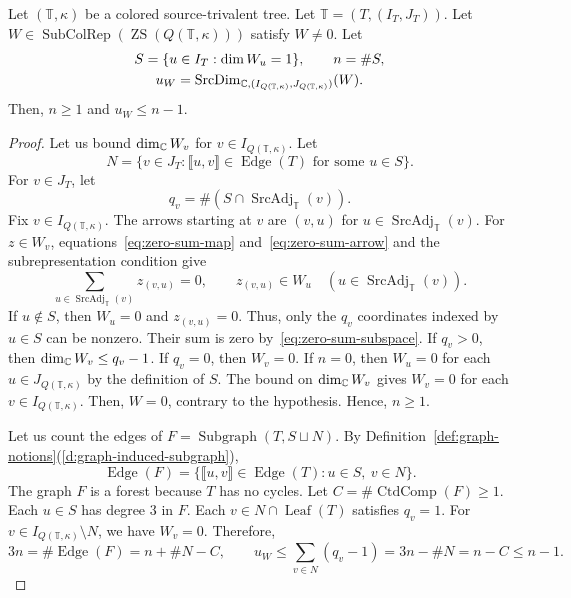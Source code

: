 \begin{lemma}\label{lem:zero-sum-source-bound}
Let $(\mathbb T,\kappa)$ be a colored source-trivalent tree.
Let $\mathbb T=(T,(I_T,J_T))$.
Let $W\in\operatorname{SubColRep}(\operatorname{ZS}(Q(\mathbb T,\kappa)))$ satisfy $W\ne0$.
Let
\[
\begin{gathered}
 S=\{u\in I_{T}:\dim W_u=1\},\qquad n=\#S,\\
 u_W=\operatorname{SrcDim}_{\mathbb C,(I_{Q(\mathbb T,\kappa)},J_{Q(\mathbb T,\kappa)})}(W).
\end{gathered}
\]
Then, $n\ge1$ and $u_W\le n-1$.
\end{lemma}
\begin{proof}
Let us bound $\dim_{\mathbb C}W_v$ for $v\in I_{Q(\mathbb T,\kappa)}$.
Let
\[
 N=\{v\in J_{T}:\llbracket u,v\rrbracket\in\operatorname{Edge}(T)
       \text{ for some }u\in S\}.
\]
For $v\in J_{T}$, let
\[
 q_v=\#(S\cap\operatorname{SrcAdj}_{\mathbb T}(v)).
\]
Fix $v\in I_{Q(\mathbb T,\kappa)}$.
The arrows starting at $v$ are $(v,u)$ for $u\in\operatorname{SrcAdj}_{\mathbb T}(v)$.
For $z\in W_v$, equations~\eqref{eq:zero-sum-map} and~\eqref{eq:zero-sum-arrow} and the subrepresentation condition give
\begin{equation}\label{eq:zero-sum-subspace}
 \sum_{u\in\operatorname{SrcAdj}_{\mathbb T}(v)}z_{(v,u)}=0,
 \qquad z_{(v,u)}\in W_u
 \quad(u\in\operatorname{SrcAdj}_{\mathbb T}(v)).
\end{equation}
If $u\notin S$, then $W_u=0$ and $z_{(v,u)}=0$.
Thus, only the $q_v$ coordinates indexed by $u\in S$ can be nonzero. Their sum is zero by~\eqref{eq:zero-sum-subspace}.
If $q_v>0$, then $\dim_{\mathbb C}W_v\le q_v-1$. If $q_v=0$, then $W_v=0$.
If $n=0$, then $W_u=0$ for each $u\in J_{Q(\mathbb T,\kappa)}$ by the definition of $S$.
The bound on $\dim_{\mathbb C}W_v$ gives $W_v=0$ for each $v\in I_{Q(\mathbb T,\kappa)}$.
Then, $W=0$, contrary to the hypothesis. Hence, $n\ge1$.

Let us count the edges of $F=\operatorname{Subgraph}(T,S\sqcup N)$.
By Definition~\ref{def:graph-notions}(\ref{d:graph-induced-subgraph}),
\[
 \operatorname{Edge}(F)=
 \{\llbracket u,v\rrbracket\in\operatorname{Edge}(T):u\in S,\ v\in N\}.
\]
The graph $F$ is a forest because $T$ has no cycles.
Let $C=\#\operatorname{CtdComp}(F)\ge1$.
Each $u\in S$ has degree $3$ in $F$.
Each $v\in N\cap\operatorname{Leaf}(T)$ satisfies $q_v=1$.
For $v\in I_{Q(\mathbb T,\kappa)}\setminus N$, we have $W_v=0$.
Therefore,
\[
 3n=\#\operatorname{Edge}(F)=n+\#N-C,\qquad
 u_W\le\sum_{v\in N}(q_v-1)=3n-\#N=n-C\le n-1.
\]
\end{proof}

